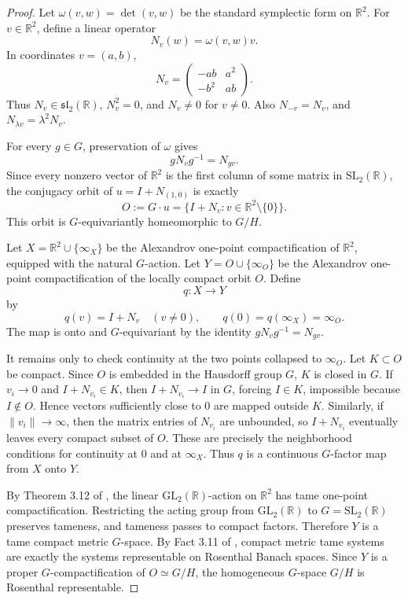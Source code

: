 \documentclass[11pt]{article}
\newcommand{\R}{\mathbb{R}}
\newcommand{\SL}{\mathrm{SL}}
\newcommand{\GL}{\mathrm{GL}}
\begin{document}
\begin{proof}
Let \(\omega(v,w)=\det(v,w)\) be the standard symplectic form on
\(\R^2\).  For \(v\in\R^2\), define a linear operator
\[
N_v(w)=\omega(v,w)v.
\]
In coordinates \(v=(a,b)\),
\[
N_v=
\begin{pmatrix}
-ab & a^2\\
-b^2 & ab
\end{pmatrix}.
\]
Thus \(N_v\in\mathfrak{sl}_2(\R)\), \(N_v^2=0\), and
\(N_v\neq 0\) for \(v\neq 0\).  Also \(N_{-v}=N_v\), and
\(N_{\lambda v}=\lambda^2N_v\).

For every \(g\in G\), preservation of \(\omega\) gives
\[
gN_vg^{-1}=N_{gv}.
\]
Since every nonzero vector of \(\R^2\) is the first column of some
matrix in \(\SL_2(\R)\), the conjugacy orbit of
\(u=I+N_{(1,0)}\) is exactly
\[
O:=G\cdot u=\{I+N_v:v\in\R^2\setminus\{0\}\}.
\]
This orbit is \(G\)-equivariantly homeomorphic to \(G/H\).

Let \(X=\R^2\cup\{\infty_X\}\) be the Alexandrov one-point
compactification of \(\R^2\), equipped with the natural \(G\)-action.
Let \(Y=O\cup\{\infty_O\}\) be the Alexandrov one-point compactification
of the locally compact orbit \(O\).  Define
\[
q:X\longrightarrow Y
\]
by
\[
q(v)=I+N_v \quad (v\neq 0), \qquad q(0)=q(\infty_X)=\infty_O.
\]
The map is onto and \(G\)-equivariant by the identity
\(gN_vg^{-1}=N_{gv}\).

It remains only to check continuity at the two points collapsed to
\(\infty_O\).  Let \(K\subset O\) be compact.  Since \(O\) is embedded
in the Hausdorff group \(G\), \(K\) is closed in \(G\).  If
\(v_i\to 0\) and \(I+N_{v_i}\in K\), then \(I+N_{v_i}\to I\) in \(G\),
forcing \(I\in K\), impossible because \(I\notin O\).  Hence vectors
sufficiently close to \(0\) are mapped outside \(K\).  Similarly, if
\(\|v_i\|\to\infty\), then the matrix entries of \(N_{v_i}\) are
unbounded, so \(I+N_{v_i}\) eventually leaves every compact subset of
\(O\).  These are precisely the neighborhood conditions for continuity
at \(0\) and at \(\infty_X\).  Thus \(q\) is a continuous
\(G\)-factor map from \(X\) onto \(Y\).

By Theorem 3.12 of \cite{Megrelishvili}, the linear
\(\GL_2(\R)\)-action on \(\R^2\) has tame one-point compactification.
Restricting the acting group from \(\GL_2(\R)\) to \(G=\SL_2(\R)\)
preserves tameness, and tameness passes to compact factors.  Therefore
\(Y\) is a tame compact metric \(G\)-space.  By Fact 3.11 of
\cite{Megrelishvili}, compact metric tame systems are exactly the
systems representable on Rosenthal Banach spaces.  Since \(Y\) is a
proper \(G\)-compactification of \(O\simeq G/H\), the homogeneous
\(G\)-space \(G/H\) is Rosenthal representable.
\end{proof}
\end{document}
